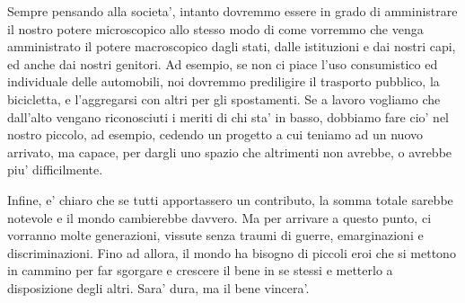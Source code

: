 Sempre pensando alla societa', intanto dovremmo essere in grado di amministrare il nostro potere microscopico allo stesso modo di come vorremmo che venga amministrato il potere macroscopico dagli stati, dalle istituzioni e dai nostri capi, ed anche dai nostri genitori.
Ad esempio, se non ci piace l'uso consumistico ed individuale delle automobili, noi dovremmo prediligire il trasporto pubblico, la bicicletta, e l'aggregarsi con altri per gli spostamenti.
Se a lavoro vogliamo che dall'alto vengano riconosciuti i meriti di chi sta' in basso, dobbiamo fare cio' nel nostro piccolo, ad esempio, cedendo un progetto a cui teniamo ad un nuovo arrivato, ma capace, per dargli uno spazio che altrimenti non avrebbe, o avrebbe piu' difficilmente.

Infine, e' chiaro che se tutti apportassero un contributo, la somma totale sarebbe notevole e il mondo cambierebbe davvero. Ma per arrivare a questo punto, ci vorranno molte generazioni, vissute senza traumi di guerre, emarginazioni e discriminazioni. Fino ad allora, il mondo ha bisogno di piccoli eroi che si mettono in cammino per far sgorgare e crescere il bene in se stessi e metterlo a disposizione degli altri. Sara' dura, ma il bene vincera'.


